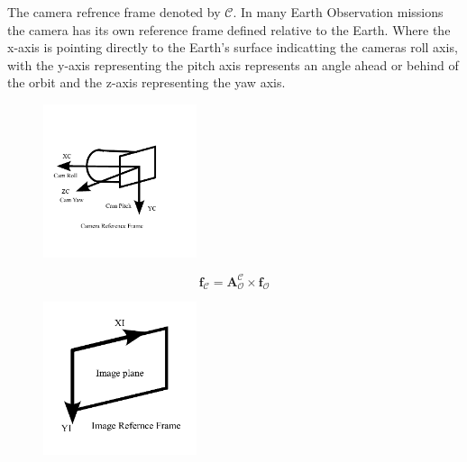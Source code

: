 
The camera refrence frame denoted by $\mathcal{C}$. In many Earth Observation missions the camera has its own reference frame defined relative to the Earth. Where the x-axis is
pointing directly to the Earth's surface indicatting the cameras roll axis, with the y-axis representing the pitch axis represents an angle ahead or behind of the orbit and the
z-axis representing the yaw axis.


\begin{figure}[H]
    \centering
    \includegraphics[width=0.4\textwidth]{figures/modelling/CRF.pdf}
    \caption{}
    \label{fig:CRF}
\end{figure}

\begin{equation}
    \mathbf{f}_{\mathcal{C}} = \mathbf{A}_{\mathcal{O}}^{\mathcal{C}}\times\mathbf{f}_{\mathcal{O}}
\end{equation}


\begin{figure}[H]
    \centering
    \includegraphics[width=0.4\textwidth]{figures/modelling/MRF.pdf}
    \caption{}
    \label{fig:MRF}
\end{figure}





